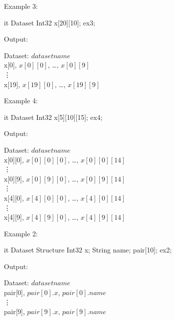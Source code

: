 \documentclass{article}
\begin{document}
\begin{enumerate}
\T\begin{minipage}{5in}
Example 3:
\T\medskip

\begin{vcode}{it}
Dataset {
    Int32 x[20][10];
} ex3;
\end{vcode}
\T\medskip

Output:\\
\begin{ttfamily}
Dataset: $dataset name$\\
x[0], $x[0][0]$, \ldots, $x[0][9]$\\
\vdots\\
x[19], $x[19][0]$, \ldots, $x[19][9]$\\
\end{ttfamily}
\T\end{minipage}
\T\bigskip

\T\begin{minipage}{5in}
Example 4:
\T\medskip

\begin{vcode}{it}
Dataset {
    Int32 x[5][10][15];
} ex4;
\end{vcode}
\T\medskip

Output:\\
\begin{ttfamily}
Dataset: $dataset name$\\
x[0][0], $x[0][0][0]$, \ldots, $x[0][0][14]$\\
\vdots\\
x[0][9], $x[0][9][0]$, \ldots, $x[0][9][14]$\\
\vdots\\
x[4][0], $x[4][0][0]$, \ldots, $x[4][0][14]$\\
\vdots\\
x[4][9], $x[4][9][0]$, \ldots, $x[4][9][14]$\\
\end{ttfamily}
\T\end{minipage}
\T\bigskip

\T\begin{minipage}{5in}
Example 2:
\T\medskip

\begin{vcode}{it}
Dataset {
    Structure {
        Int32 x;
        String name;
    } pair[10];
} ex2;
\end{vcode}
\T\medskip

Output:\\
\begin{ttfamily}
Dataset: $dataset name$\\
pair[0], $pair[0].x$, $pair[0].name$\\
\vdots\\
pair[9], $pair[9].x$, $pair[9].name$
\end{ttfamily}
\T\end{minipage}
\T\bigskip


\end{enumerate}
\end{document}
